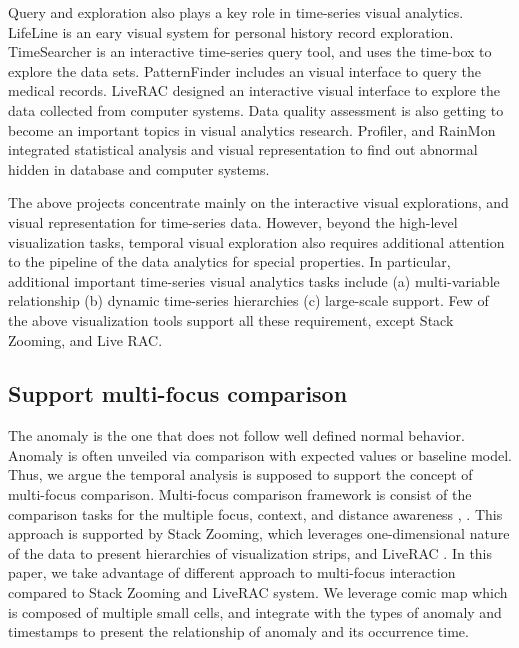 \documentclass{vgtc}                          %
\begin{document}
	Query and exploration also plays a key role in time-series visual analytics. LifeLine\cite{plaisant1996lifelines} is an eary visual system for personal history record exploration. TimeSearcher\cite{hochheiser2004dynamic} is an interactive time-series query tool, and uses the time-box to explore the data sets. PatternFinder \cite{fails2006visual} includes an visual interface to query the medical records. LiveRAC \cite{mclachlan2008liverac} designed an interactive visual interface to explore the data collected from computer systems. Data quality assessment is also getting to become an important topics in visual analytics research. Profiler\cite{Kandel2012}, and RainMon\cite{shafer2012rainmon} integrated statistical analysis and visual representation to find out abnormal hidden in database and computer systems. 
	
	The above projects concentrate mainly on the interactive visual explorations, and visual representation for time-series data. However, beyond the high-level visualization tasks, temporal visual exploration also requires additional attention to the pipeline of the data analytics for special properties. In particular, additional important time-series visual analytics tasks include (a) multi-variable relationship (b) dynamic time-series hierarchies (c) large-scale support\cite{javed2010stack}. Few of the above visualization tools support all these requirement, except Stack Zooming\cite{javed2010stack}, and Live RAC\cite{mclachlan2008liverac}. 
	
\subsection{Support multi-focus comparison}

	The anomaly is the one that does not follow well defined normal behavior\cite{Chandola2009}. Anomaly is often unveiled via comparison with expected values or baseline model. Thus, we argue the temporal analysis is supposed to support the concept of multi-focus comparison. Multi-focus comparison framework is consist of the comparison tasks for the multiple focus, context, and distance awareness \cite{javed2010stack}, \cite{elmqvist2008melange}. This approach is supported by Stack Zooming\cite{javed2010stack}, which leverages one-dimensional nature of the data to present hierarchies of visualization strips, and LiveRAC \cite{mclachlan2008liverac}. In this paper, we take advantage of different approach to multi-focus interaction compared to Stack Zooming and LiveRAC system. We leverage comic map which is composed of multiple small cells, and integrate with the types of anomaly and timestamps to present the relationship of anomaly and its occurrence time. 
	
\end{document}
